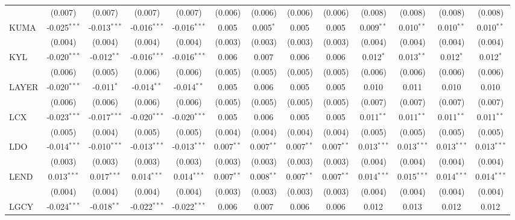 \begin{table}[!htbp]
\begin{tabular}{@{\extracolsep{5pt}}lcccccccccccc}
  & (0.007) & (0.007) & (0.007) & (0.007) & (0.006) & (0.006) & (0.006) & (0.006) & (0.008) & (0.008) & (0.008) & (0.008) \\
 KUMA & -0.025$^{***}$ & -0.013$^{***}$ & -0.016$^{***}$ & -0.016$^{***}$ & 0.005$^{}$ & 0.005$^{*}$ & 0.005$^{}$ & 0.005$^{}$ & 0.009$^{**}$ & 0.010$^{**}$ & 0.010$^{**}$ & 0.010$^{**}$ \\
  & (0.004) & (0.004) & (0.004) & (0.004) & (0.003) & (0.003) & (0.003) & (0.003) & (0.004) & (0.004) & (0.004) & (0.004) \\
 KYL & -0.020$^{***}$ & -0.012$^{**}$ & -0.016$^{***}$ & -0.016$^{***}$ & 0.006$^{}$ & 0.007$^{}$ & 0.006$^{}$ & 0.006$^{}$ & 0.012$^{*}$ & 0.013$^{**}$ & 0.012$^{*}$ & 0.012$^{*}$ \\
  & (0.006) & (0.005) & (0.006) & (0.006) & (0.005) & (0.005) & (0.005) & (0.005) & (0.006) & (0.006) & (0.006) & (0.006) \\
 LAYER & -0.020$^{***}$ & -0.011$^{*}$ & -0.014$^{**}$ & -0.014$^{**}$ & 0.005$^{}$ & 0.006$^{}$ & 0.005$^{}$ & 0.005$^{}$ & 0.010$^{}$ & 0.011$^{}$ & 0.010$^{}$ & 0.010$^{}$ \\
  & (0.006) & (0.006) & (0.006) & (0.006) & (0.005) & (0.005) & (0.005) & (0.005) & (0.007) & (0.007) & (0.007) & (0.007) \\
 LCX & -0.023$^{***}$ & -0.017$^{***}$ & -0.020$^{***}$ & -0.020$^{***}$ & 0.005$^{}$ & 0.006$^{}$ & 0.005$^{}$ & 0.005$^{}$ & 0.011$^{**}$ & 0.011$^{**}$ & 0.011$^{**}$ & 0.011$^{**}$ \\
  & (0.005) & (0.004) & (0.005) & (0.005) & (0.004) & (0.004) & (0.004) & (0.004) & (0.005) & (0.005) & (0.005) & (0.005) \\
 LDO & -0.014$^{***}$ & -0.010$^{***}$ & -0.013$^{***}$ & -0.013$^{***}$ & 0.007$^{**}$ & 0.007$^{**}$ & 0.007$^{**}$ & 0.007$^{**}$ & 0.013$^{***}$ & 0.013$^{***}$ & 0.013$^{***}$ & 0.013$^{***}$ \\
  & (0.003) & (0.003) & (0.003) & (0.003) & (0.003) & (0.003) & (0.003) & (0.003) & (0.004) & (0.004) & (0.004) & (0.004) \\
 LEND & 0.013$^{***}$ & 0.017$^{***}$ & 0.014$^{***}$ & 0.014$^{***}$ & 0.007$^{**}$ & 0.008$^{**}$ & 0.007$^{**}$ & 0.007$^{**}$ & 0.014$^{***}$ & 0.015$^{***}$ & 0.014$^{***}$ & 0.014$^{***}$ \\
  & (0.004) & (0.004) & (0.004) & (0.004) & (0.003) & (0.003) & (0.003) & (0.003) & (0.004) & (0.004) & (0.004) & (0.004) \\
 LGCY & -0.024$^{***}$ & -0.018$^{**}$ & -0.022$^{***}$ & -0.022$^{***}$ & 0.006$^{}$ & 0.007$^{}$ & 0.006$^{}$ & 0.006$^{}$ & 0.012$^{}$ & 0.013$^{}$ & 0.012$^{}$ & 0.012$^{}$ \\

\end{tabular}
\end{table}
